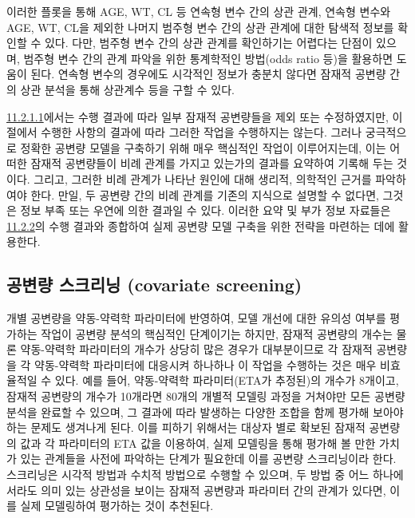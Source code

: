 \documentclass[
  11pt,
  krantz2,
  a4paper]{krantz}
\theoremstyle{definition}
\theoremstyle{definition}
\theoremstyle{definition}
\theoremstyle{remark}
\begin{document}
이러한 플롯을 통해 AGE, WT, CL 등 연속형 변수 간의 상관 관계, 연속형 변수와 AGE, WT, CL을 제외한 나머지 범주형 변수 간의 상관 관계에 대한 탐색적 정보를 확인할 수 있다. 다만, 범주형 변수 간의 상관 관계를 확인하기는 어렵다는 단점이 있으며, 범주형 변수 간의 관계 파악을 위한 통계학적인 방법(odds ratio 등)을 활용하면 도움이 된다. 연속형 변수의 경우에도 시각적인 정보가 충분치 않다면 잠재적 공변량 간의 상관 분석을 통해 상관계수 등을 구할 수 있다.

\protect\hyperlink{variable-eval}{11.2.1.1}에서는 수행 결과에 따라 일부 잠재적 공변량들을 제외 또는 수정하였지만, 이 절에서 수행한 사항의 결과에 따라 그러한 작업을 수행하지는 않는다. 그러나 궁극적으로 정확한 공변량 모델을 구축하기 위해 매우 핵심적인 작업이 이루어지는데, 이는 어떠한 잠재적 공변량들이 비례 관계를 가지고 있는가의 결과를 요약하여 기록해 두는 것이다. 그리고, 그러한 비례 관계가 나타난 원인에 대해 생리적, 의학적인 근거를 파악하여야 한다. 만일, 두 공변량 간의 비례 관계를 기존의 지식으로 설명할 수 없다면, 그것은 정보 부족 또는 우연에 의한 결과일 수 있다. 이러한 요약 및 부가 정보 자료들은 \protect\hyperlink{cov-screening}{11.2.2}의 수행 결과와 종합하여 실제 공변량 모델 구축을 위한 전략을 마련하는 데에 활용한다.

\hypertarget{cov-screening}{%
\subsection{공변량 스크리닝 (covariate screening)}\label{cov-screening}}

개별 공변량을 약동-약력학 파라미터에 반영하여, 모델 개선에 대한 유의성 여부를 평가하는 작업이 공변량 분석의 핵심적인 단계이기는 하지만, 잠재적 공변량의 개수는 물론 약동-약력학 파라미터의 개수가 상당히 많은 경우가 대부분이므로 각 잠재적 공변량을 각 약동-약력학 파라미터에 대응시켜 하나하나 이 작업을 수행하는 것은 매우 비효율적일 수 있다. 예를 들어, 약동-약력학 파라미터(ETA가 추정된)의 개수가 8개이고, 잠재적 공변량의 개수가 10개라면 80개의 개별적 모델링 과정을 거쳐야만 모든 공변량 분석을 완료할 수 있으며, 그 결과에 따라 발생하는 다양한 조합을 함께 평가해 보아야 하는 문제도 생겨나게 된다. 이를 피하기 위해서는 대상자 별로 확보된 잠재적 공변량의 값과 각 파라미터의 ETA 값을 이용하여, 실제 모델링을 통해 평가해 볼 만한 가치가 있는 관계들을 사전에 파악하는 단계가 필요한데 이를 공변량 스크리닝이라 한다. 스크리닝은 시각적 방법과 수치적 방법으로 수행할 수 있으며, 두 방법 중 어느 하나에서라도 의미 있는 상관성을 보이는 잠재적 공변량과 파라미터 간의 관계가 있다면, 이를 실제 모델링하여 평가하는 것이 추천된다.
\end{document}
